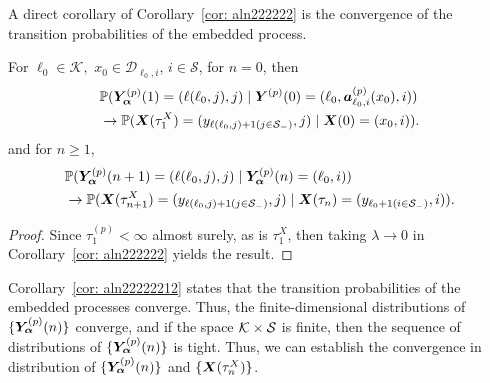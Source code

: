 A direct corollary of Corollary~\ref{cor: aln222222} is the convergence of the transition probabilities of the embedded process. 
\begin{cor}\label{cor: aln22222212} For \(\ell_0\in \mathcal K,\) \(x_0\in\mathcal D_{\ell_0,i}\), \(i\in\mathcal S\), 
		for \(n=0\), then
		\begin{align}
			&\mathbb P(\bm{Y}_{\bm{\alpha}}^{(p)}(1) = (\ell(\ell_0,j),j)
					 \mid \boldsymbol Y^{(p)}(0) = (\ell_0,\boldsymbol a_{\ell_0,i}^{(p)}(x_0),i)) \nonumber
			\\&\to  
				\mathbb P(\boldsymbol X(\tau_1^X) = (y_{\ell(\ell_0,j)+1(j\in\mathcal{S}_-)}, j)  \mid \boldsymbol X(0) = (x_0,i)).\label{eqn: lim 2}
		\end{align}
		and for \(n\geq 1\),  
		\begin{align}
			&\mathbb P(\bm{Y}_{\bm{\alpha}}^{(p)}(n+1) = (\ell(\ell_0,j),j) 
					 \mid \bm{Y}_{\bm{\alpha}}^{(p)}(n) = (\ell_0,i) ) \nonumber
			\\&\to  
				\mathbb P(\boldsymbol X(\tau_{n+1}^X) = (y_{\ell(\ell_0,j)+1(j\in\mathcal{S}_-)}, j) \mid \boldsymbol X(\tau_{n}) = (y_{\ell_0+1(i\in\mathcal{S}_-)},i) ).\label{eqn: ddddddd2}
		\end{align}
\end{cor}
\begin{proof}
	Since \(\tau_1^{(p)}<\infty\) almost surely, as is \(\tau_1^X\), then taking \(\lambda \to 0\) in Corollary~\ref{cor: aln222222} yields the result. 
\end{proof}
Corollary~\ref{cor: aln22222212} states that the transition probabilities of the embedded processes converge. Thus, the finite-dimensional distributions of \(\{\bm{Y}_{\bm{\alpha}}^{(p)}(n)\}\) converge, and if the space \(\mathcal K\times \mathcal{S}\) is finite, then the sequence of distributions of \(\{\bm{Y}_{\bm{\alpha}}^{(p)}(n)\}\) is tight. Thus, we can establish the convergence in distribution of \(\{\bm{Y}_{\bm{\alpha}}^{(p)}(n)\}\) and \(\{\boldsymbol X(\tau_n^X)\}\). 

